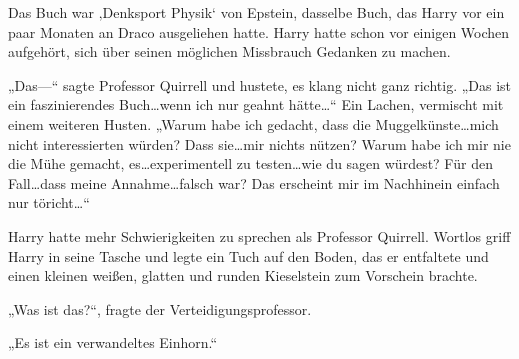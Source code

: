 Das Buch war ‚Denksport Physik‘ von Epstein, dasselbe Buch, das Harry vor ein paar Monaten an Draco ausgeliehen hatte. Harry hatte schon vor einigen Wochen aufgehört, sich über seinen möglichen Missbrauch Gedanken zu machen.

„Das—“
sagte Professor Quirrell und hustete, es klang nicht ganz richtig.
„Das ist ein faszinierendes Buch…wenn ich nur geahnt hätte…“
Ein Lachen, vermischt mit einem weiteren Husten.
„Warum habe ich gedacht, dass die Muggelkünste…mich nicht interessierten würden? Dass sie…mir nichts nützen? Warum habe ich mir nie die Mühe gemacht, es…experimentell zu testen…wie du sagen würdest? Für den Fall…dass meine Annahme…falsch war? Das erscheint mir im Nachhinein einfach nur töricht…“

Harry hatte mehr Schwierigkeiten zu sprechen als Professor Quirrell. Wortlos griff Harry in seine Tasche und legte ein Tuch auf den Boden, das er entfaltete und einen kleinen weißen, glatten und runden Kieselstein zum Vorschein brachte.

„Was ist das?“, fragte der Verteidigungsprofessor.

„Es ist ein verwandeltes Einhorn.“

